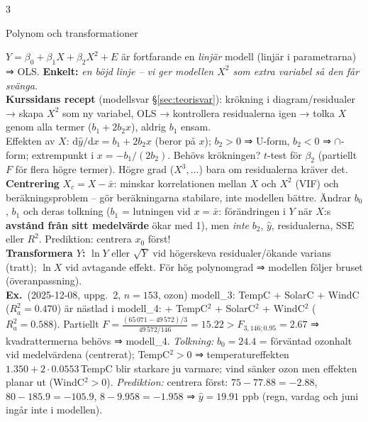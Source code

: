 \documentclass[8pt]{extarticle}
\makeatletter
\newcounter{sect}
\newcommand{\sect}[3][hd]{\par\vspace{1.5pt}\refstepcounter{sect}\noindent
  {\setlength{\fboxsep}{1.8pt}\colorbox{#1}{\parbox{\dimexpr\linewidth-2\fboxsep}{\color{white}\sffamily\bfseries
  \strut\thesect\enspace #2}}}\label{#3}\par\nobreak\vspace{0.8pt}\@afterheading}
\newcommand{\ex}{{\color{ex}\sffamily\bfseries Ex.}\ }
\newcommand{\enk}[1]{{\color{cEnk}\sffamily\bfseries Enkelt:} {\itshape #1}}
\newcommand{\SSE}{\mathrm{SSE}}
\newlength{\figunit}\setlength{\figunit}{1.07cm}%
\newcommand{\miniram}[2][1.6]{%
  \draw[gray!60] (0,-0.5) rectangle (#1,0.5);
  \node[font=\fontsize{5}{5.6}\selectfont\sffamily,anchor=north,align=center] at ({#1/2},-0.5) {#2};}
\newenvironment{figrad}{\par\vspace{1.5pt}\centering}{\par\vspace{1.5pt}}%
\makeatother
\begin{document}
\begin{multicols*}{3}
\sect[cBygg]{Polynom och transformationer}{sec:poly}
$Y=\beta_0+\beta_1X+\beta_2X^2+E$ är fortfarande en \emph{linjär} modell (linjär i parametrarna) ⇒ OLS. \enk{en böjd linje – vi ger modellen $X^2$ som extra variabel så den får svänga.}\\
\textbf{Kurssidans recept} (modellsvar §\ref{sec:teorisvar}): krökning i diagram/residualer → skapa $X^2$ som ny variabel, OLS → kontrollera residualerna igen → tolka $X$ genom alla termer ($b_1+2b_2x$), aldrig $b_1$ ensam.\\
Effekten av $X$: $\mathrm d\hat y/\mathrm dx=b_1+2b_2x$ (beror på $x$); $b_2>0$ ⇒ U-form, $b_2<0$ ⇒ $\cap$-form; extrempunkt i $x=-b_1/(2b_2)$. Behövs krökningen? $t$-test för $\beta_2$ (partiellt $F$ för flera högre termer). Högre grad ($X^3,\dots$) bara om residualerna kräver det.\\
\textbf{Centrering} $X_c=X-\bar x$: minskar korrelationen mellan $X$ och $X^2$ (VIF) och beräkningsproblem – gör beräkningarna stabilare, inte modellen bättre. Ändrar $b_0$, $b_1$ och deras tolkning ($b_1$ = lutningen vid $x=\bar x$: förändringen i $Y$ när $X$:s \textbf{avstånd från sitt medelvärde} ökar med 1), men \emph{inte} $b_2$, $\hat y$, residualerna, $\SSE$ eller $R^2$. Prediktion: centrera $x_0$ först!\\
\textbf{Transformera $Y$:} $\ln Y$ eller $\sqrt Y$ vid högerskeva residualer/ökande varians (tratt); $\ln X$ vid avtagande effekt. För hög polynomgrad ⇒ modellen följer bruset (överanpassning).\\
\ex (2025-12-08, uppg.\ 2, $n=153$, ozon) modell\_3: TempC + SolarC + WindC ($R^2_a=0.470$) är nästlad i modell\_4: + TempC$^2$ + SolarC$^2$ + WindC$^2$ ($R^2_a=0.588$). Partiellt $F=\frac{(65\,071-49\,572)/3}{49\,572/146}=15.22>F_{3,146;0.95}=2.67$ ⇒ kvadrattermerna behövs ⇒ modell\_4. \emph{Tolkning:} $b_0=24.4$ = förväntad ozonhalt vid medelvärdena (centrerat); TempC$^2>0$ ⇒ temperatureffekten $1.350+2\cdot0.0553\,$TempC blir starkare ju varmare; vind sänker ozon men effekten planar ut (WindC$^2>0$). \emph{Prediktion:} centrera först: $75-77.88=-2.88$, $80-185.9=-105.9$, $8-9.958=-1.958$ ⇒ $\hat y=19.91$ ppb (regn, vardag och juni ingår inte i modellen).
\begin{figrad}
\end{figrad}
\end{multicols*}
\end{document}
